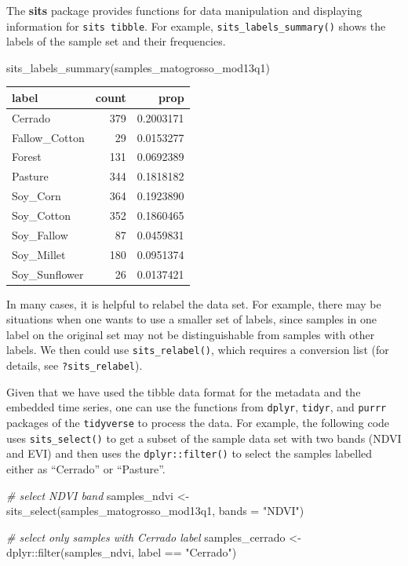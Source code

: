 \documentclass[a4paper,]{tufte-book}
\newenvironment{Shaded}{}{}
\newcommand{\AttributeTok}[1]{\textcolor[rgb]{0.49,0.56,0.16}{#1}}
\newcommand{\CommentTok}[1]{\textcolor[rgb]{0.38,0.63,0.69}{\textit{#1}}}
\newcommand{\FunctionTok}[1]{\textcolor[rgb]{0.02,0.16,0.49}{#1}}
\newcommand{\NormalTok}[1]{#1}
\newcommand{\OtherTok}[1]{\textcolor[rgb]{0.00,0.44,0.13}{#1}}
\newcommand{\SpecialCharTok}[1]{\textcolor[rgb]{0.25,0.44,0.63}{#1}}
\newcommand{\StringTok}[1]{\textcolor[rgb]{0.25,0.44,0.63}{#1}}
\begin{document}
The \textbf{sits} package provides functions for data manipulation and displaying information for \texttt{sits\ tibble}. For example, \texttt{sits\_labels\_summary()} shows the labels of the sample set and their frequencies.

\begin{Shaded}
\begin{Highlighting}[]
\FunctionTok{sits\_labels\_summary}\NormalTok{(samples\_matogrosso\_mod13q1)}
\end{Highlighting}
\end{Shaded}

\begin{tabular}{l|r|r}
\hline
label & count & prop\\
\hline
Cerrado & 379 & 0.2003171\\
\hline
Fallow\_Cotton & 29 & 0.0153277\\
\hline
Forest & 131 & 0.0692389\\
\hline
Pasture & 344 & 0.1818182\\
\hline
Soy\_Corn & 364 & 0.1923890\\
\hline
Soy\_Cotton & 352 & 0.1860465\\
\hline
Soy\_Fallow & 87 & 0.0459831\\
\hline
Soy\_Millet & 180 & 0.0951374\\
\hline
Soy\_Sunflower & 26 & 0.0137421\\
\hline
\end{tabular}

In many cases, it is helpful to relabel the data set. For example, there may be situations when one wants to use a smaller set of labels, since samples in one label on the original set may not be distinguishable from samples with other labels. We then could use \texttt{sits\_relabel()}, which requires a conversion list (for details, see \texttt{?sits\_relabel}).

Given that we have used the tibble data format for the metadata and the embedded time series, one can use the functions from \texttt{dplyr}, \texttt{tidyr}, and \texttt{purrr} packages of the \texttt{tidyverse} \citep{Wickham2017} to process the data. For example, the following code uses \texttt{sits\_select()} to get a subset of the sample data set with two bands (NDVI and EVI) and then uses the \texttt{dplyr::filter()} to select the samples labelled either as ``Cerrado'' or ``Pasture''.

\begin{Shaded}
\begin{Highlighting}[]
\CommentTok{\# select NDVI band}
\NormalTok{samples\_ndvi }\OtherTok{\textless{}{-}} \FunctionTok{sits\_select}\NormalTok{(samples\_matogrosso\_mod13q1, }
                            \AttributeTok{bands =} \StringTok{"NDVI"}\NormalTok{)}

\CommentTok{\# select only samples with Cerrado label}
\NormalTok{samples\_cerrado }\OtherTok{\textless{}{-}}
\NormalTok{    dplyr}\SpecialCharTok{::}\FunctionTok{filter}\NormalTok{(samples\_ndvi, }
\NormalTok{                  label }\SpecialCharTok{==} \StringTok{"Cerrado"}\NormalTok{)}
\end{Highlighting}
\end{Shaded}
\end{document}
